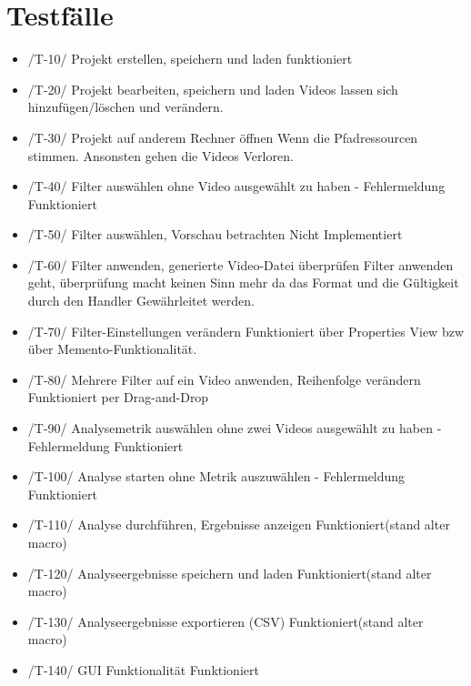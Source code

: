 \section{Testfälle}
\begin{itemize}
\item /T-10/ Projekt erstellen, speichern und laden \newline
funktioniert
\item /T-20/ Projekt bearbeiten, speichern und laden\newline
Videos lassen sich hinzufügen/löschen und verändern.
\item /T-30/ Projekt auf anderem Rechner öffnen\newline
Wenn die Pfadressourcen stimmen. Ansonsten gehen die Videos Verloren.
\item /T-40/ Filter auswählen ohne Video ausgewählt zu haben - Fehlermeldung \newline
Funktioniert
\item /T-50/ Filter auswählen, Vorschau betrachten \newline
Nicht Implementiert
\item /T-60/ Filter anwenden, generierte Video-Datei überprüfen \newline
Filter anwenden geht, überprüfung macht keinen Sinn mehr da das Format und die Gültigkeit durch den Handler Gewährleitet werden.
\item /T-70/ Filter-Einstellungen verändern \newline
Funktioniert über Properties View bzw über Memento-Funktionalität.
\item /T-80/ Mehrere Filter auf ein Video anwenden, Reihenfolge verändern \newline
Funktioniert per Drag-and-Drop
\item /T-90/ Analysemetrik auswählen ohne zwei Videos ausgewählt zu haben - Fehlermeldung \newline
Funktioniert
\item /T-100/ Analyse starten ohne Metrik auszuwählen - Fehlermeldung \newline
Funktioniert
\item /T-110/ Analyse durchführen, Ergebnisse anzeigen \newline
Funktioniert(stand alter macro)
\item /T-120/ Analyseergebnisse speichern und laden \newline
Funktioniert(stand alter macro)
\item /T-130/ Analyseergebnisse exportieren (CSV) \newline
Funktioniert(stand alter macro)
\item /T-140/ GUI Funktionalität \newline
Funktioniert
\end{itemize}